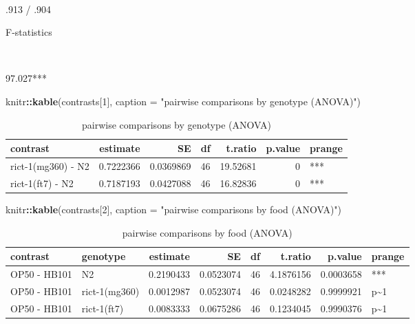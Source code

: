 \documentclass[]{article}
\newenvironment{Shaded}{\begin{snugshade}}{\end{snugshade}}
\newcommand{\KeywordTok}[1]{\textcolor[rgb]{0.13,0.29,0.53}{\textbf{#1}}}
\newcommand{\DataTypeTok}[1]{\textcolor[rgb]{0.13,0.29,0.53}{#1}}
\newcommand{\DecValTok}[1]{\textcolor[rgb]{0.00,0.00,0.81}{#1}}
\newcommand{\StringTok}[1]{\textcolor[rgb]{0.31,0.60,0.02}{#1}}
\newcommand{\OperatorTok}[1]{\textcolor[rgb]{0.81,0.36,0.00}{\textbf{#1}}}
\newcommand{\NormalTok}[1]{#1}
\begin{document}
~

.913 / .904

F-statistics

~

97.027***

\begin{Shaded}
\begin{Highlighting}[]
\NormalTok{knitr}\OperatorTok{::}\KeywordTok{kable}\NormalTok{(contrasts[}\DecValTok{1}\NormalTok{], }\DataTypeTok{caption =} \StringTok{"pairwise comparisons by genotype (ANOVA)"}\NormalTok{)}
\end{Highlighting}
\end{Shaded}

\begin{table}
\caption{pairwise comparisons by genotype (ANOVA)}

\centering
\begin{tabular}[t]{l|r|r|r|r|r|l}
\hline
contrast & estimate & SE & df & t.ratio & p.value & prange\\
\hline
rict-1(mg360) - N2 & 0.7222366 & 0.0369869 & 46 & 19.52681 & 0 & ***\\
\hline
rict-1(ft7) - N2 & 0.7187193 & 0.0427088 & 46 & 16.82836 & 0 & ***\\
\hline
\end{tabular}
\end{table}

\begin{Shaded}
\begin{Highlighting}[]
\NormalTok{knitr}\OperatorTok{::}\KeywordTok{kable}\NormalTok{(contrasts[}\DecValTok{2}\NormalTok{], }\DataTypeTok{caption =} \StringTok{"pairwise comparisons by food (ANOVA)"}\NormalTok{)}
\end{Highlighting}
\end{Shaded}

\begin{table}
\caption{pairwise comparisons by food (ANOVA)}

\centering
\begin{tabular}[t]{l|l|r|r|r|r|r|l}
\hline
contrast & genotype & estimate & SE & df & t.ratio & p.value & prange\\
\hline
OP50 - HB101 & N2 & 0.2190433 & 0.0523074 & 46 & 4.1876156 & 0.0003658 & ***\\
\hline
OP50 - HB101 & rict-1(mg360) & 0.0012987 & 0.0523074 & 46 & 0.0248282 & 0.9999921 & p\textasciitilde{}1\\
\hline
OP50 - HB101 & rict-1(ft7) & 0.0083333 & 0.0675286 & 46 & 0.1234045 & 0.9990376 & p\textasciitilde{}1\\
\hline
\end{tabular}
\end{table}
\end{document}
